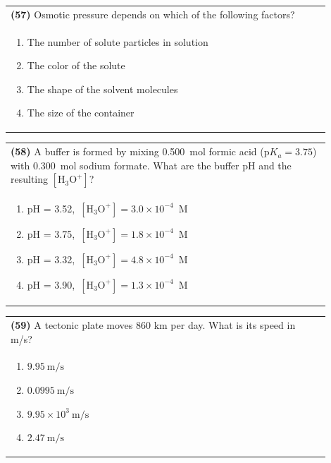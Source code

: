 \documentclass{article}
\begin{document}
\noindent\begin{tabular}{|p{0.9\linewidth}|}
\hline
\textbf{(57)} Osmotic pressure depends on which of the following factors?\\[0.2cm]
\begin{minipage}[t]{0.85\linewidth}
\begin{enumerate}[label=\alph*.]
\item The number of solute particles in solution
\item The color of the solute
\item The shape of the solvent molecules
\item The size of the container
\end{enumerate}
\end{minipage}\\[0.2cm]
\hline
\end{tabular}

\noindent\begin{tabular}{|p{0.9\linewidth}|}
\hline
\textbf{(58)} A buffer is formed by mixing 0.500~mol formic acid (p$K_a=3.75$) with 0.300~mol sodium formate. What are the buffer pH and the resulting $[\mathrm{H_3O^+}]$?\\[0.2cm]
\begin{minipage}[t]{0.85\linewidth}
\begin{enumerate}[label=\alph*.]
\item pH = 3.52,\ $[\mathrm{H_3O^+}] = 3.0\times10^{-4}$~M
\item pH = 3.75,\ $[\mathrm{H_3O^+}] = 1.8\times10^{-4}$~M
\item pH = 3.32,\ $[\mathrm{H_3O^+}] = 4.8\times10^{-4}$~M
\item pH = 3.90,\ $[\mathrm{H_3O^+}] = 1.3\times10^{-4}$~M
\end{enumerate}
\end{minipage}\\[0.2cm]
\hline
\end{tabular}

\noindent\begin{tabular}{|p{0.9\linewidth}|}
\hline
\textbf{(59)} A tectonic plate moves 860 km per day. What is its speed in m/s? \\
\begin{minipage}[t]{0.85\linewidth}
\begin{enumerate}[label=\alph*.]
    \item $9.95~\text{m/s}$
    \item $0.0995~\text{m/s}$
    \item $9.95 \times 10^3~\text{m/s}$
    \item $2.47~\text{m/s}$
\end{enumerate}
\end{minipage}\\[0.2cm]
\hline
\end{tabular}
\end{document}
